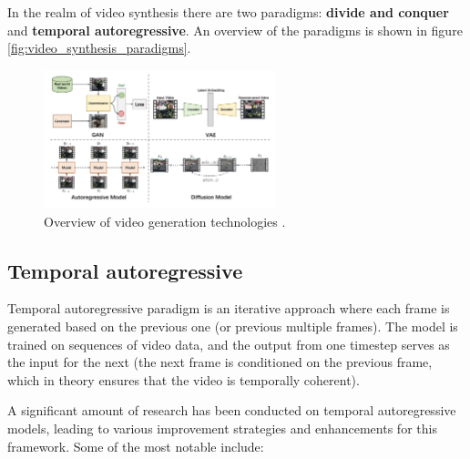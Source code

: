 In the realm of video synthesis there are two paradigms: \textbf{divide and conquer} and \textbf{temporal autoregressive}. An overview of the paradigms is shown in figure \ref{fig:video_synthesis_paradigms}.


\begin{figure}
    \centering
    \includegraphics[width=0.6\textwidth]{images/video_synthesis/generation_technologies.png}
    \caption{Overview of video generation technologies \cite{zhou2024survey}.}
\end{figure}









\subsection*{Temporal autoregressive}

Temporal autoregressive paradigm is an iterative approach where each frame is generated based on the previous one (or previous multiple frames). The model is trained on sequences of video data, and the output from one timestep serves as the input for the next (the next frame is conditioned on the previous frame, which in theory ensures that the video is temporally coherent).

A significant amount of research has been conducted on temporal autoregressive models, leading to various improvement strategies and enhancements for this framework. Some of the most notable include:


